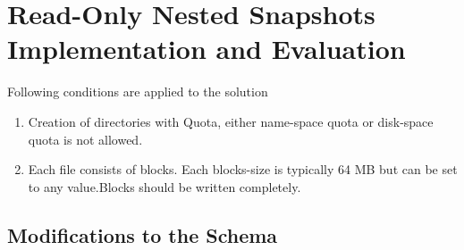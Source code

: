 
%
%
%


\chapter{Read-Only Nested Snapshots Implementation and Evaluation}
\label{ch:RORLSSIE}
Following conditions are applied to the solution
\begin{enumerate}
\item Creation of directories with Quota, either name-space quota or disk-space quota is not allowed.
\item Each file consists of blocks. Each blocks-size is typically 64 MB but can be set to any value.Blocks should be written completely.
\end{enumerate}



\section{Modifications to the Schema}

